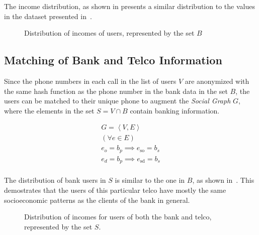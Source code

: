 The income distribution, as shown in  presents a similar distribution to the values in the dataset presented in~.

\begin{figure}
\centering
{}
\caption{Distribution of incomes of users, represented by the set $B$}
\label{fig:income_distribution}
\end{figure}

\subsection{Matching of Bank and Telco Information}

Since the phone numbers in each call in the list of users $V$ are anonymized with the same hash function as the phone number in the bank data in the set $B$, the users can be matched to their unique phone to augment the \emph{Social Graph} $G$, where the elements in the set $S = V \cap B$ contain banking information.

\begin{equation}
\label{eq:banktelcojoin}
\begin{gathered}
G = \left< V, E \right> \\
( \forall e \in E ) \\
e_o = b_p \implies e_{\operatorname{so}} = b_s \\
e_d = b_p \implies e_{\operatorname{sd}} = b_s \\
\end{gathered}
\end{equation}

The distribution of bank users in $S$ is similar to the one in $B$, as shown in~. This demostrates that the users of this particular telco have mostly the same socioeconomic patterns as the clients of the bank in general.

\begin{figure}
\centering
{}
\caption{Distribution of incomes for users of both the bank and telco, represented by the set $S$.}
\label{fig:matchdistribution}
\end{figure}


